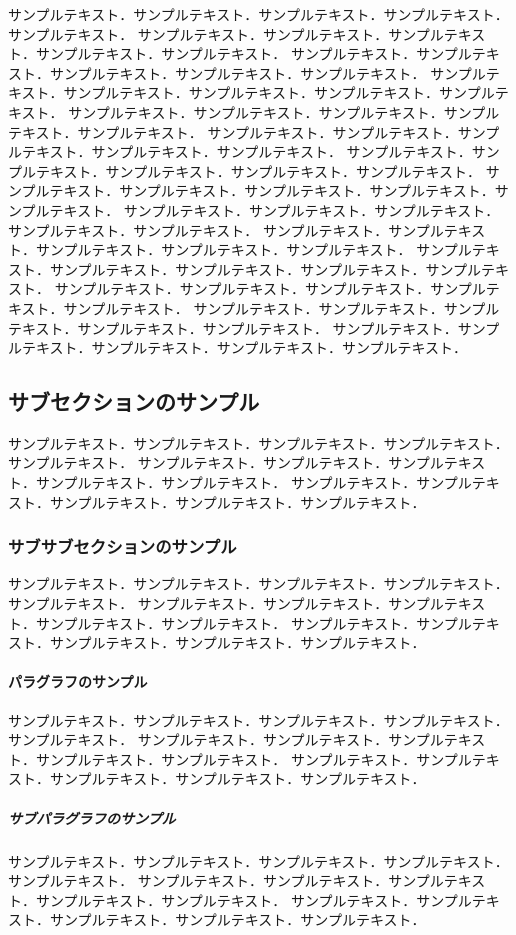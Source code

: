 \documentclass[main]{subfiles}
\begin{document}
サンプルテキスト．サンプルテキスト．サンプルテキスト．サンプルテキスト．サンプルテキスト．
サンプルテキスト．サンプルテキスト．サンプルテキスト．サンプルテキスト．サンプルテキスト．
サンプルテキスト．サンプルテキスト．サンプルテキスト．サンプルテキスト．サンプルテキスト．
サンプルテキスト．サンプルテキスト．サンプルテキスト．サンプルテキスト．サンプルテキスト．
サンプルテキスト．サンプルテキスト．サンプルテキスト．サンプルテキスト．サンプルテキスト．
サンプルテキスト．サンプルテキスト．サンプルテキスト．サンプルテキスト．サンプルテキスト．
サンプルテキスト．サンプルテキスト．サンプルテキスト．サンプルテキスト．サンプルテキスト．
サンプルテキスト．サンプルテキスト．サンプルテキスト．サンプルテキスト．サンプルテキスト．
サンプルテキスト．サンプルテキスト．サンプルテキスト．サンプルテキスト．サンプルテキスト．
サンプルテキスト．サンプルテキスト．サンプルテキスト．サンプルテキスト．サンプルテキスト．
サンプルテキスト．サンプルテキスト．サンプルテキスト．サンプルテキスト．サンプルテキスト．
サンプルテキスト．サンプルテキスト．サンプルテキスト．サンプルテキスト．サンプルテキスト．
サンプルテキスト．サンプルテキスト．サンプルテキスト．サンプルテキスト．サンプルテキスト．
サンプルテキスト．サンプルテキスト．サンプルテキスト．サンプルテキスト．サンプルテキスト．

\subsection{サブセクションのサンプル}

サンプルテキスト．サンプルテキスト．サンプルテキスト．サンプルテキスト．サンプルテキスト．
サンプルテキスト．サンプルテキスト．サンプルテキスト．サンプルテキスト．サンプルテキスト．
サンプルテキスト．サンプルテキスト．サンプルテキスト．サンプルテキスト．サンプルテキスト．

\subsubsection{サブサブセクションのサンプル}

サンプルテキスト．サンプルテキスト．サンプルテキスト．サンプルテキスト．サンプルテキスト．
サンプルテキスト．サンプルテキスト．サンプルテキスト．サンプルテキスト．サンプルテキスト．
サンプルテキスト．サンプルテキスト．サンプルテキスト．サンプルテキスト．サンプルテキスト．

\paragraph{パラグラフのサンプル}

サンプルテキスト．サンプルテキスト．サンプルテキスト．サンプルテキスト．サンプルテキスト．
サンプルテキスト．サンプルテキスト．サンプルテキスト．サンプルテキスト．サンプルテキスト．
サンプルテキスト．サンプルテキスト．サンプルテキスト．サンプルテキスト．サンプルテキスト．

\subparagraph{サブパラグラフのサンプル}

サンプルテキスト．サンプルテキスト．サンプルテキスト．サンプルテキスト．サンプルテキスト．
サンプルテキスト．サンプルテキスト．サンプルテキスト．サンプルテキスト．サンプルテキスト．
サンプルテキスト．サンプルテキスト．サンプルテキスト．サンプルテキスト．サンプルテキスト．
\end{document}

